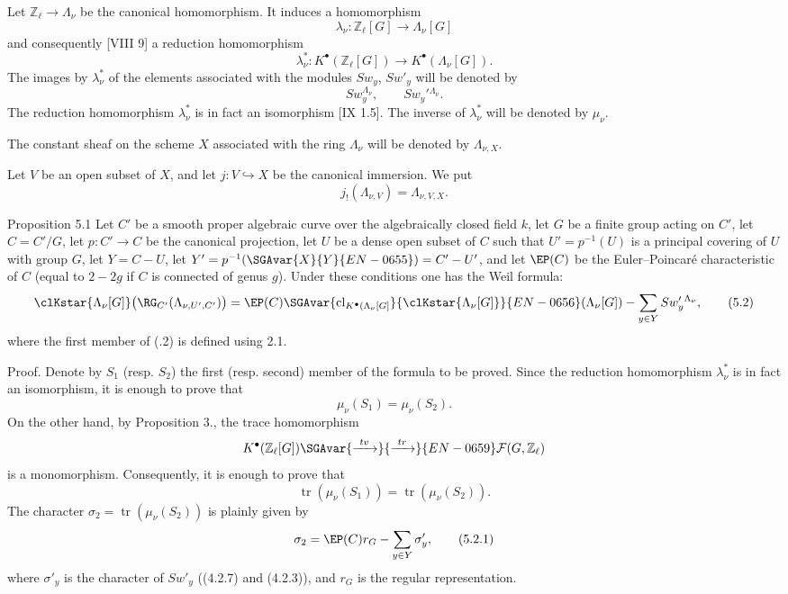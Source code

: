 Let $\mathbb Z_\ell\to\Lambda_\nu$ be the canonical homomorphism. It induces a homomorphism
\[
\lambda_\nu:\mathbb Z_\ell[G]\longrightarrow \Lambda_\nu[G]
\]
and consequently [VIII 9] a reduction homomorphism
\[
\lambda_\nu^*:K^{\bullet}(\mathbb Z_\ell[G])\longrightarrow K^{\bullet}(\Lambda_\nu[G]).
\]
The images by $\lambda_\nu^*$ of the elements associated with the modules $Sw_y$, $Sw'_y$ will be denoted by
\[
Sw_y^{\Lambda_\nu},\qquad Sw_y'{}^{\Lambda_\nu}.
\]
The reduction homomorphism $\lambda_\nu^*$ is in fact an isomorphism [IX 1.5]. The inverse of $\lambda_\nu^*$ will be denoted by $\mu_\nu$.

The constant sheaf on the scheme $X$ associated with the ring $\Lambda_\nu$ will be denoted by $\Lambda_{\nu,X}$.

Let $V$ be an open subset of $X$, and let $j:V\hookrightarrow X$ be the canonical immersion. We put
\[
j_!(\Lambda_{\nu,V})=\Lambda_{\nu,V,X}.
\]

\begin{statement}{Proposition 5.1}
Let $C'$ be a smooth proper algebraic curve over the algebraically closed field $k$, let $G$ be a finite group acting on $C'$, let $C=C'/G$, let $p:C'\to C$ be the canonical projection, let $U$ be a dense open subset of $C$ such that $U'=p^{-1}(U)$ is a principal covering of $U$ with group $G$, let $Y=C-U$, let $Y'=p^{-1}(\SGAvar{X}{Y}{EN-0655})=C'-U'$, and let $\EP(C)$ be the Euler--Poincaré characteristic of $C$ (equal to $2-2g$ if $C$ is connected of genus $g$).
Under these conditions one has the Weil formula:
\[
\clKstar{\Lambda_\nu[G]}\bigl(\RG_{C'}(\Lambda_{\nu,U',C'})\bigr)
=
\EP(C)\SGAvar{\operatorname{cl}_{K^{\bullet}(\Lambda_\nu[G]}}{\clKstar{\Lambda_\nu[G]}}{EN-0656}(\Lambda_\nu[G])
-\sum_{y\in Y}Sw_y'{}^{\Lambda_\nu},
\tag{5.2}
\]
where the first member of (.2) is defined using 2.1.
\end{statement}

Proof. Denote by $S_1$ (resp. $S_2$) the first (resp. second) member of the formula to be proved. Since the reduction homomorphism $\lambda_\nu^*$ is in fact an isomorphism, it is enough to prove that
\[
\mu_\nu(S_1)=\mu_\nu(S_2).
\]
On the other hand, by Proposition 3., the trace homomorphism
\[
K^{\bullet}(\mathbb Z_\ell[G])\SGAvar{\xrightarrow{\ tv\ }}{\xrightarrow{\ tr\ }}{EN-0659}\mathcal F(G,\mathbb Z_\ell)
\]
is a monomorphism. Consequently, it is enough to prove that
\[
\operatorname{tr}(\mu_\nu(S_1))=\operatorname{tr}(\mu_\nu(S_2)).
\]
The character $\sigma_2=\operatorname{tr}(\mu_\nu(S_2))$ is plainly given by
\[
\sigma_2=\EP(C)r_G-\sum_{y\in Y}\sigma'_y,
\tag{5.2.1}
\]
where $\sigma'_y$ is the character of $Sw'_y$ ((4.2.7) and (4.2.3)), and $r_G$ is the regular representation.

